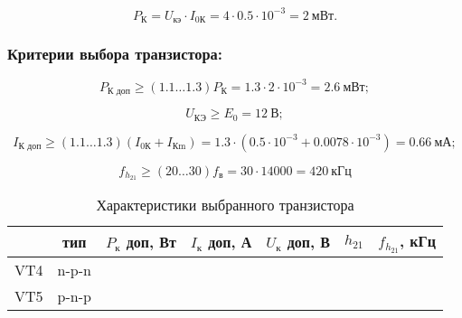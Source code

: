   \begin{equation}
  \label{eq:equation6_10}
    P_{\text{К}} = U_{\text{кэ}} \cdot I_{\text{0К}} = 4 \cdot 0.5 \cdot 10^{-3} = 2~\text{мВт}. 
  \end{equation}
  

  \subsubsection{Критерии выбора транзистора:} %

  \begin{equation}
  \label{eq:equation6_11}
    P_{\text{К доп}} \geq (1.1 \ldots 1.3) P_{\text{К}} = 1.3 \cdot 2 \cdot 10^{-3} = 2.6~\text{мВт};
  \end{equation} 

  \begin{equation}
   \label{eq:equation6_12}
     U_{\text{КЭ}} \geq E_0 = 12~\text{В};
  \end{equation} 

  \begin{equation}
  \label{eq:equation6_13}
    I_{\text{К доп}} \geq (1.1 \ldots 1.3)(I_{\text{0К}} + I_{\text{Кm}}) = 1.3 \cdot (0.5 \cdot 10^{-3} + 0.0078 \cdot 10^{-3}) = 0.66~\text{мА}; 
  \end{equation} 

  \begin{equation}
   \label{eq:equation6_14}
     f_{h_{21}} \geq (20 \ldots 30) f_{\text{в}} = 30 \cdot 14000 = 420~\text{кГц}
  \end{equation} 

\begin{table}[htbp]
\caption{Характеристики выбранного транзистора}
\begin{center}\begin{tabular}{|c|c|c|c|c|c|c|}
\hline 
  & тип & $P_{\text{к}}$ доп, Вт & $I_{\text{к}}$ доп, А & $U_{\text{к}}$ доп, В & $h_{21}$ &  $f_{h_{21}}$, кГц \\ 
\hline 
VT4 & n-p-n &   &  &  &  & \\ 
\hline 
VT5 & p-n-p &   &  &  &  &  \\ 
\hline 
\end{tabular} 
\end{center}
\end{table}

